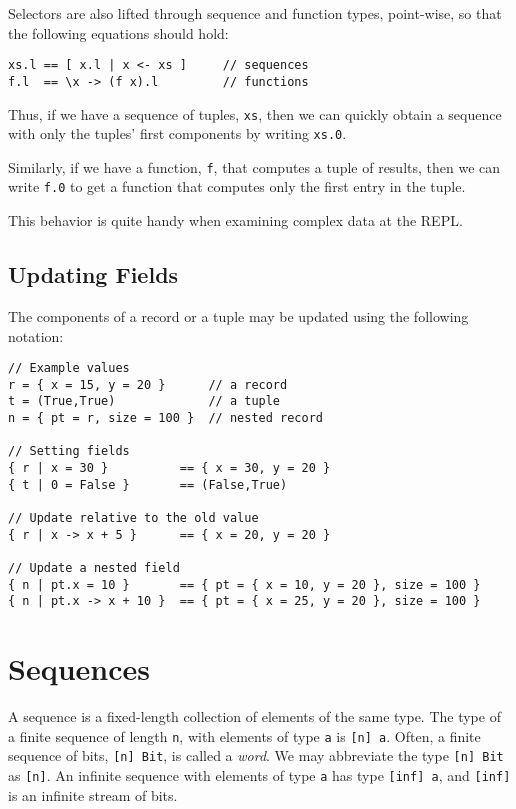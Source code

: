 Selectors are also lifted through sequence and function types,
point-wise, so that the following equations should hold:

\begin{verbatim}
xs.l == [ x.l | x <- xs ]     // sequences
f.l  == \x -> (f x).l         // functions
\end{verbatim}

Thus, if we have a sequence of tuples, \texttt{xs}, then we can quickly
obtain a sequence with only the tuples' first components by writing
\texttt{xs.0}.

Similarly, if we have a function, \texttt{f}, that computes a tuple of
results, then we can write \texttt{f.0} to get a function that computes
only the first entry in the tuple.

This behavior is quite handy when examining complex data at the REPL.

\subsection{Updating Fields}\label{updating-fields}

The components of a record or a tuple may be updated using the following
notation:

\begin{verbatim}
// Example values
r = { x = 15, y = 20 }      // a record
t = (True,True)             // a tuple
n = { pt = r, size = 100 }  // nested record

// Setting fields
{ r | x = 30 }          == { x = 30, y = 20 }
{ t | 0 = False }       == (False,True)

// Update relative to the old value
{ r | x -> x + 5 }      == { x = 20, y = 20 }

// Update a nested field
{ n | pt.x = 10 }       == { pt = { x = 10, y = 20 }, size = 100 }
{ n | pt.x -> x + 10 }  == { pt = { x = 25, y = 20 }, size = 100 }
\end{verbatim}

\section{Sequences}\label{sequences}

A sequence is a fixed-length collection of elements of the same type.
The type of a finite sequence of length \texttt{n}, with elements of
type \texttt{a} is \texttt{{[}n{]}\ a}. Often, a finite sequence of
bits, \texttt{{[}n{]}\ Bit}, is called a \emph{word}. We may abbreviate
the type \texttt{{[}n{]}\ Bit} as \texttt{{[}n{]}}. An infinite sequence
with elements of type \texttt{a} has type \texttt{{[}inf{]}\ a}, and
\texttt{{[}inf{]}} is an infinite stream of bits.

